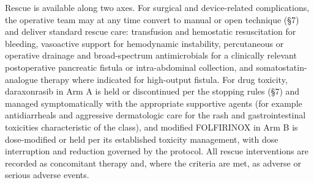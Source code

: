 Rescue is available along two axes. For surgical and device-related complications,
the operative team may at any time convert to manual or open technique (\S7) and
deliver standard rescue care: transfusion and hemostatic resuscitation for bleeding,
vasoactive support for hemodynamic instability, percutaneous or operative drainage and
broad-spectrum antimicrobials for a clinically relevant postoperative pancreatic
fistula or intra-abdominal collection, and somatostatin-analogue therapy where
indicated for high-output fistula. For drug toxicity, daraxonrasib in Arm A is held or
discontinued per the stopping rules (\S7) and managed symptomatically with the
appropriate supportive agents (for example antidiarrheals and aggressive dermatologic
care for the rash and gastrointestinal toxicities characteristic of the class), and
modified FOLFIRINOX in Arm B is dose-modified or held per its established toxicity
management, with dose interruption and reduction governed by the protocol. All rescue
interventions are recorded as concomitant therapy and, where the criteria are met, as
adverse or serious adverse events.
